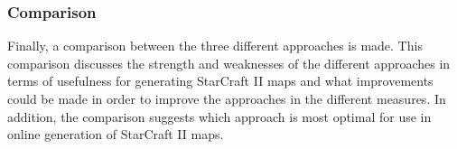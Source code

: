 \subsubsection{Comparison}
Finally, a comparison between the three different approaches is made. This comparison discusses the strength and weaknesses of the different approaches in terms of usefulness for generating StarCraft II maps and what improvements could be made in order to improve the approaches in the different measures. In addition, the comparison suggests which approach is most optimal for use in online generation of StarCraft II maps. 
